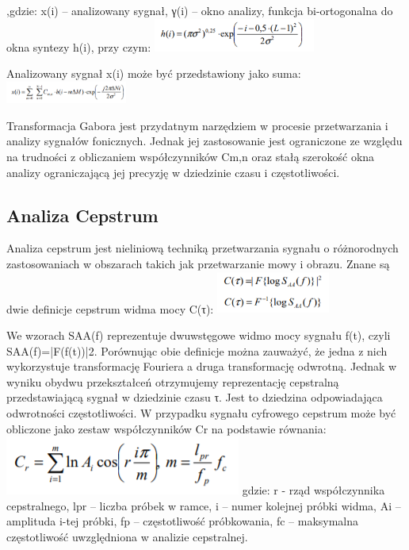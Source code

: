\documentclass[a4paper,titleauthor]{mwart}
\begin{document}
,gdzie: x(i) – analizowany sygnał, γ(i) – okno analizy, funkcja bi-ortogonalna do okna syntezy h(i), przy czym:\newline
	\includegraphics[width=0.4\textwidth]{transG2.png}

Analizowany sygnał x(i) może być przedstawiony jako suma:\newline
	\includegraphics[width=0.3\textwidth]{transG3.png}

Transformacja Gabora jest przydatnym narzędziem w procesie przetwarzania i analizy sygnałów fonicznych. Jednak jej zastosowanie jest ograniczone ze względu na trudności z obliczaniem współczynników Cm,n oraz stałą szerokość okna analizy ograniczającą jej precyzję w dziedzinie czasu i częstotliwości.
\subsection{Analiza Cepstrum}
Analiza cepstrum jest nieliniową techniką przetwarzania sygnału o różnorodnych zastosowaniach w obszarach takich jak przetwarzanie mowy i obrazu.
Znane są dwie definicje cepstrum widma mocy C(τ):\newline
	\includegraphics[width=0.28\textwidth]{Acepstrum1.png}

We wzorach SAA(f) reprezentuje dwuwstęgowe widmo mocy sygnału f(t), czyli SAA(f)=|F(f(t))|2. Porównując obie definicje można zauważyć, że jedna z nich wykorzystuje transformację Fouriera a druga transformację odwrotną. Jednak w wyniku obydwu przekształceń otrzymujemy reprezentację cepstralną przedstawiającą sygnał w dziedzinie czasu τ. Jest to dziedzina odpowiadająca odwrotności częstotliwości.
W przypadku sygnału cyfrowego cepstrum może być obliczone jako zestaw współczynników Cr na podstawie równania: \newline
	\includegraphics[width=0.3 \textwidth]{Acepstrum2.png}
gdzie: r - rząd współczynnika cepstralnego, lpr – liczba próbek w ramce, i – numer kolejnej próbki widma, Ai – amplituda i-tej próbki, fp – częstotliwość próbkowania, fc – maksymalna częstotliwość uwzględniona w analizie cepstralnej.
\end{document}
